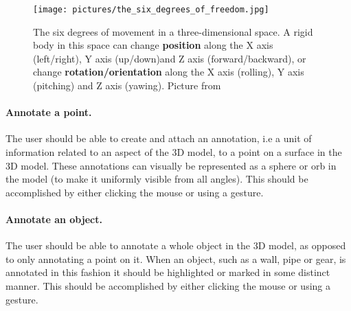 \begin{figure}%
	\texttt{[image: pictures/the\_six\_degrees\_of\_freedom.jpg]}
	\caption[The six degrees of freedom]{The six degrees of movement in a three-dimensional space. A rigid body in this space can change \textbf{position} along the X axis (left/right), 
	Y axis (up/down)and Z axis (forward/backward), or change \textbf{rotation/orientation} along the X axis (rolling), Y axis (pitching) and Z axis (yawing).
	Picture from \citet{6DOF}}
	\label{fig:the_six_degrees_of_freedom}
\end{figure} 

\paragraph{Annotate a point.} The user should be able to create and attach an annotation, i.e a unit of information related to an aspect of the 3D model, to a point on a surface in
the 3D model. These annotations can visually be represented as a sphere or orb in the model (to make it uniformly visible from all angles). This should be accomplished by
either clicking the mouse or using a gesture. 

\paragraph{Annotate an object.} The user should be able to annotate a whole object in the 3D model, as opposed to only annotating a point on it. When an object, such
as a wall, pipe or gear, is annotated in this fashion it should be highlighted or marked in some distinct manner. This should be accomplished by
either clicking the mouse or using a gesture. 

